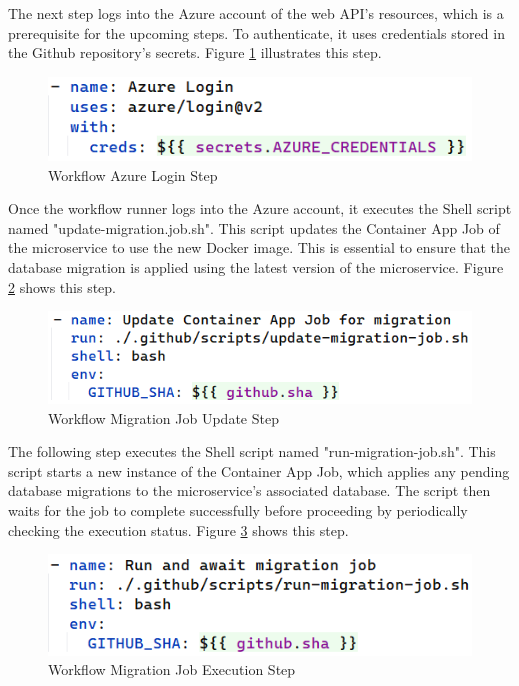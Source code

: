 \documentclass[12pt, reqno, oneside]{amsbook}
\theoremstyle{definition}
\theoremstyle{definition}
\numberwithin{section}{chapter}
\numberwithin{table}{chapter}
\numberwithin{figure}{chapter}
\begin{document}
The next step logs into the Azure account of the web \ac{API}'s resources, which is a prerequisite for the upcoming steps. To authenticate, it uses credentials stored in the Github repository's secrets. Figure \ref{Figure:GithubWorkflowAzureLogin} illustrates this step.

\begin{figure}[H]
  \centering
  \includegraphics[width=0.7\linewidth]{images/GithubWorkflowAzureLogin.png}
  \caption{\label{Figure:GithubWorkflowAzureLogin}Workflow Azure Login Step}
\end{figure}

Once the workflow runner logs into the Azure account, it executes the Shell script named "update-migration.job.sh". This script updates the Container App Job of the microservice to use the new Docker image. This is essential to ensure that the database migration is applied using the latest version of the microservice. Figure \ref{Figure:GithubWorkflowMigrationJobUpdate} shows this step.

\begin{figure}[H]
  \centering
  \includegraphics[width=0.7\linewidth]{images/GithubWorkflowMigrationJobUpdate.png}
  \caption{\label{Figure:GithubWorkflowMigrationJobUpdate}Workflow Migration Job Update Step}
\end{figure}

The following step executes the Shell script named "run-migration-job.sh". This script starts a new instance of the Container App Job, which applies any pending database migrations to the microservice's associated database. The script then waits for the job to complete successfully before proceeding by periodically checking the execution status. Figure \ref{Figure:GithubWorkflowMigrationJobExecution} shows this step.

\begin{figure}[H]
  \centering
  \includegraphics[width=0.7\linewidth]{images/GithubWorkflowMigrationJobExecution.png}
  \caption{\label{Figure:GithubWorkflowMigrationJobExecution}Workflow Migration Job Execution Step}
\end{figure}
\end{document}
